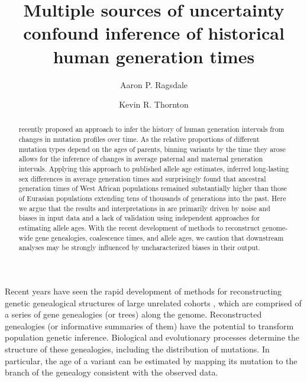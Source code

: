 \documentclass[]{article}
\title{Multiple sources of uncertainty confound inference of
historical human generation times}
\author[1,*]{Aaron P. Ragsdale}
\author[2]{Kevin R. Thornton}
\affil[1]{University of Wisconsin--Madison, Wisconsin, USA}
\affil[2]{University of California, Irvine, California, USA}
\affil[*]{apragsdale@wisc.edu}
\begin{document}
\maketitle

\begin{abstract}

    \noindent \citet{wang2023human} recently proposed an approach to infer the
    history of human generation intervals from changes in mutation profiles
    over time. As the relative proportions of different mutation types depend
    on the ages of parents, binning variants by the time they arose allows for
    the inference of changes in average paternal and maternal generation
    intervals. Applying this approach to published allele age estimates,
    \citet{wang2023human} inferred long-lasting sex differences in average
    generation times and surprisingly found that ancestral generation times of
    West African populations remained substantially higher than those of
    Eurasian populations extending tens of thousands of generations into the
    past. Here we argue that the results and interpretations in
    \citet{wang2023human} are primarily driven by noise and biases in input
    data and a lack of validation using independent approaches for estimating
    allele ages. With the recent development of methods to reconstruct
    genome-wide gene genealogies, coalescence times, and allele ages, we
    caution that downstream analyses may be strongly influenced by
    uncharacterized biases in their output.

\end{abstract}

Recent years have seen the rapid development of methods for reconstructing
genetic genealogical structures of large unrelated cohorts
\citep{speidel2019method,wohns2022unified,hubisz2020mapping}, which are
comprised of a series of gene genealogies (or trees) along the genome.
Reconstructed genealogies (or informative summaries of them) have the potential
to transform population genetic inference. Biological and evolutionary
processes determine the structure of these genealogies, including the
distribution of mutations. In particular, the age of a variant can be estimated
by mapping its mutation to the branch of the genealogy consistent with the
observed data.
\end{document}
